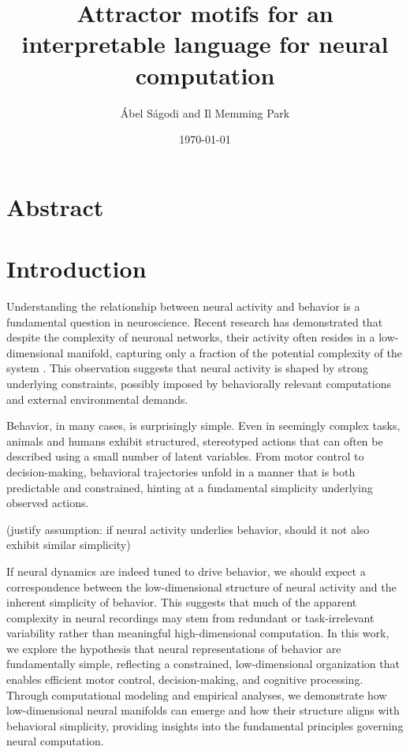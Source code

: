\documentclass{article}
\title{Attractor motifs for an interpretable language for neural computation}
\author{\'Abel S\'agodi and Il Memming Park}
\date{\today}
\newcommand{\ascomment}[1]{\textcolor{ascolor}{(#1)}}
\theoremstyle{definition} \newtheorem{definition}{Definition}  \newtheorem{example}{Example}
\theoremstyle{remark} \newtheorem{remark}{Remark}
\newcounter{ct}
\begin{document}
\maketitle

\section*{Abstract}




\section{Introduction}\label{sec:intro}
Understanding the relationship between neural activity and behavior is a fundamental question in neuroscience.
 Recent research has demonstrated that despite the complexity of neuronal networks, their activity often resides in a low-dimensional manifold, capturing only a fraction of the potential complexity of the system \citep{duncker2021dynamics}.
 This observation suggests that neural activity is shaped by strong underlying constraints, possibly imposed by behaviorally relevant computations and external environmental demands.

Behavior, in many cases, is surprisingly simple. Even in seemingly complex tasks, animals and humans exhibit structured, stereotyped actions that can often be described using a small number of latent variables.
 From motor control to decision-making, behavioral trajectories unfold in a manner that is both predictable and constrained, hinting at a fundamental simplicity underlying observed actions.

\ascomment{justify assumption: if neural activity underlies behavior, should it not also exhibit similar simplicity}

If neural dynamics are indeed tuned to drive behavior, we should expect a correspondence between the low-dimensional structure of neural activity and the inherent simplicity of behavior.
 This suggests that much of the apparent complexity in neural recordings may stem from redundant or task-irrelevant variability rather than meaningful high-dimensional computation.
  In this work, we explore the hypothesis that neural representations of behavior are fundamentally simple, reflecting a constrained, low-dimensional organization that enables efficient motor control, decision-making, and cognitive processing.
 Through computational modeling and empirical analyses, we demonstrate how low-dimensional neural manifolds can emerge and how their structure aligns with behavioral simplicity, providing insights into the fundamental principles governing neural computation.
 
\end{document}

